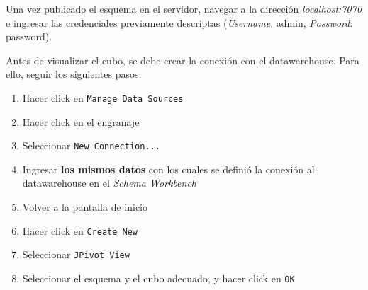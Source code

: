 Una vez publicado el esquema en el servidor, navegar a la dirección \emph{localhost:7070} e ingresar las credenciales previamente descriptas (\emph{Username}: admin, \emph{Password}: password). 

Antes de visualizar el cubo, se debe crear la conexión con el datawarehouse. Para ello, seguir los siguientes pasos:

\begin{enumerate}
    \item Hacer click en \texttt{Manage Data Sources}
    \item Hacer click en el engranaje
    \item Seleccionar \texttt{New Connection...}
    \item Ingresar \textbf{los mismos datos} con los cuales se definió la conexión al datawarehouse en el \emph{Schema Workbench}   
    \item Volver a la pantalla de inicio
    \item Hacer click en \texttt{Create New}
    \item Seleccionar \texttt{JPivot View} 
    \item Seleccionar el esquema y el cubo adecuado, y hacer click en \texttt{OK} 
\end{enumerate}






\clearpage
\printbibliography



